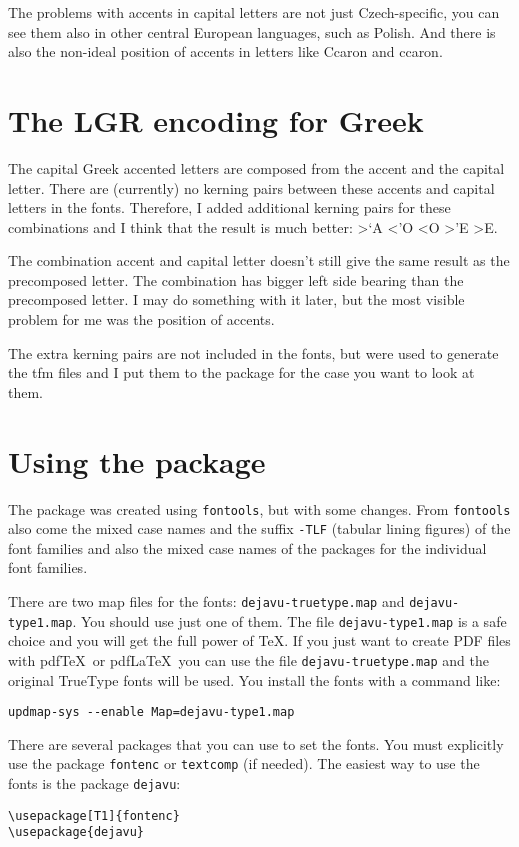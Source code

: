 \documentclass[oneside]{scrartcl}
\begin{document}
The problems with accents in capital letters are not just Czech-specific, you
can see them also in other central European languages, such as Polish. And there
is also the non-ideal position of accents in letters like Ccaron and ccaron.


\section{The LGR encoding for Greek}

The capital Greek accented letters are composed from the accent and the
capital letter. There are (currently) no kerning pairs between these accents
and capital letters in the fonts. Therefore, I added additional kerning pairs
for these combinations and I think that the result is much better:
\textgreek{>`A <'O <O >'E >E}.

The combination accent and capital letter doesn't still give the same result
as the precomposed letter. The combination has bigger left side bearing than
the precomposed letter. I may do something with it later, but the most visible
problem for me was the position of accents.

The extra kerning pairs are not included in the fonts, but were used to
generate the tfm files and I put them to the package for the case you want
to look at them.


\section{Using the package}

The package was created using \texttt{fontools}, but with some changes. From
\texttt{fontools} also come the mixed case names and the suffix \texttt{-TLF}
(tabular lining figures) of the font families and also the mixed case
names of the packages for the individual font families.

There are two map files for the fonts: \texttt{dejavu-truetype.map} and \texttt{dejavu-type1.map}.
You should use just one of them. The file \texttt{dejavu-type1.map} is a safe
choice and you will get the full power of \TeX. If you just want to create PDF
files with pdf\TeX\ or pdf\LaTeX\ you can use the file
\texttt{dejavu-truetype.map} and the original TrueType fonts will be used.
You install the fonts with a command like:
\begin{verbatim}
updmap-sys --enable Map=dejavu-type1.map
\end{verbatim}

There are several packages that you can use to set the fonts. You
must explicitly use the package \texttt{fontenc} or \texttt{textcomp} (if
needed). The easiest way to use the fonts is the package \texttt{dejavu}:
\begin{verbatim}
\usepackage[T1]{fontenc}
\usepackage{dejavu}
\end{verbatim}
\end{document}
